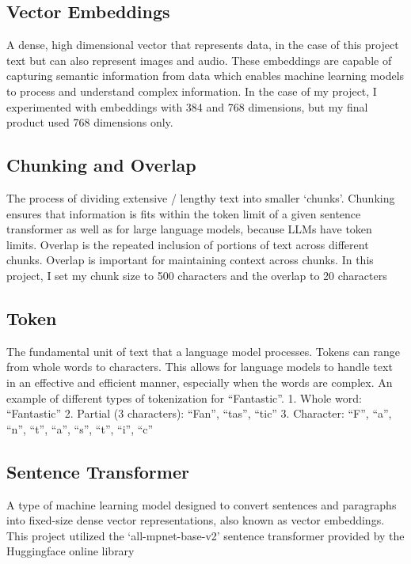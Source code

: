 \documentclass[10pt,twocolumn]{article}
\begin{document}
\subsection {Vector Embeddings \cite{pinecone_embeddings}} A dense, high dimensional vector that represents data, in the case of this project text but can also represent images and audio. These embeddings are capable of capturing semantic information from data which enables machine learning models to process and understand complex information. In the case of my project, I experimented with embeddings with 384 and 768 dimensions, but my final product used 768 dimensions only.
\vspace{10pt}
\subsection{Chunking and Overlap \cite{langchain_long_text}} The process of dividing extensive / lengthy text into smaller ‘chunks’. Chunking ensures that information is fits within the token limit of a given sentence transformer as well as for large language models, because LLMs have token limits. Overlap is the repeated inclusion of portions of text across different chunks. Overlap is important for maintaining context across chunks. In this project, I set my chunk size to 500 characters and the overlap to 20 characters
\vspace{10pt}
\subsection {Token \cite{langchain_tokens} } The fundamental unit of text that a language model processes. Tokens can range from whole words to characters. This allows for language models to handle text in an effective and efficient manner, especially when the words are complex. An example of different types of tokenization for “Fantastic”. 
1. Whole word: “Fantastic”
2. Partial (3 characters): “Fan”, “tas”, “tic”
3. Character: “F”, “a”, “n”, “t”, “a”, “s”, “t”, “i”, “c”
\vspace{10pt}
\subsection{Sentence Transformer \cite{huggingface_train_sentence_transformers} } A type of machine learning model designed to convert sentences and paragraphs into fixed-size dense vector representations, also known as vector embeddings. This project utilized the ‘all-mpnet-base-v2’ sentence transformer provided by the Huggingface online library
\vspace{10pt}
\end{document}
